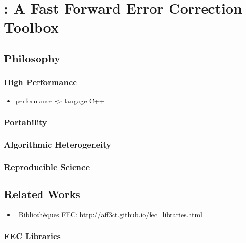 
\graphicspath{{main/chapter4/fig/}}

\chapter{\AFFECT: A Fast Forward Error Correction Toolbox}

\minitoccustom

\section{Philosophy}

\subsection{High Performance}

\begin{itemize}
  \item performance -> langage C++
\end{itemize}

\subsection{Portability}

\subsection{Algorithmic Heterogeneity}

\subsection{Reproducible Science}

\section{Related Works}

\begin{itemize}
  \item \cmark~Bibliothèques FEC: \url{http://aff3ct.github.io/fec_libraries.html}
\end{itemize}

\subsection{FEC Libraries}


